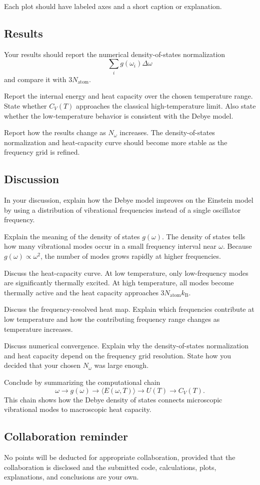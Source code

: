 Each plot should have labeled axes and a short caption or explanation.

\subsection{Results}

Your results should report the numerical density-of-states normalization
\[
\sum_i g(\omega_i)\Delta\omega
\]
and compare it with \(3N_{\mathrm{atom}}\).

Report the internal energy and heat capacity over the chosen temperature range. State whether \(C_V(T)\) approaches the classical high-temperature limit. Also state whether the low-temperature behavior is consistent with the Debye model.

Report how the results change as \(N_\omega\) increases. The density-of-states normalization and heat-capacity curve should become more stable as the frequency grid is refined.

\subsection{Discussion}

In your discussion, explain how the Debye model improves on the Einstein model by using a distribution of vibrational frequencies instead of a single oscillator frequency.

Explain the meaning of the density of states \(g(\omega)\). The density of states tells how many vibrational modes occur in a small frequency interval near \(\omega\). Because \(g(\omega)\propto\omega^2\), the number of modes grows rapidly at higher frequencies.

Discuss the heat-capacity curve. At low temperature, only low-frequency modes are significantly thermally excited. At high temperature, all modes become thermally active and the heat capacity approaches \(3N_{\mathrm{atom}}k_{\mathrm B}\).

Discuss the frequency-resolved heat map. Explain which frequencies contribute at low temperature and how the contributing frequency range changes as temperature increases.

Discuss numerical convergence. Explain why the density-of-states normalization and heat capacity depend on the frequency grid resolution. State how you decided that your chosen \(N_\omega\) was large enough.

Conclude by summarizing the computational chain
\[
\omega
\longrightarrow
g(\omega)
\longrightarrow
\langle E(\omega,T)\rangle
\longrightarrow
U(T)
\longrightarrow
C_V(T).
\]
This chain shows how the Debye density of states connects microscopic vibrational modes to macroscopic heat capacity.

\subsection{Collaboration reminder}

No points will be deducted for appropriate collaboration, provided that the collaboration is disclosed and the submitted code, calculations, plots, explanations, and conclusions are your own.
